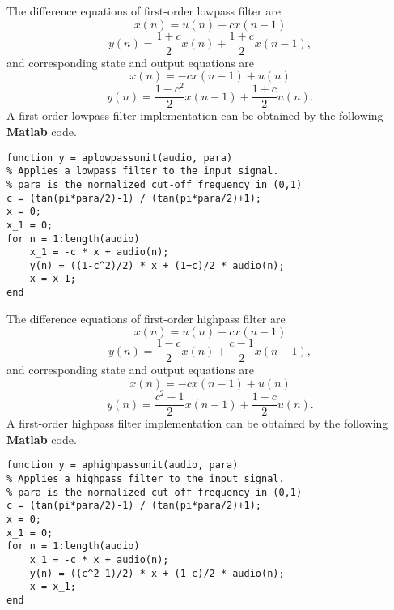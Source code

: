 \documentclass[10pt,a4paper,oneside]{article}
\begin{document}
The difference equations of first-order lowpass filter are
\[
x(n) = u(n) - cx(n-1)
\]
\[
y(n) = \frac{1+c}{2}x(n) + \frac{1+c}{2}x(n-1),
\]
and corresponding state and output equations are
\[
x(n) = -cx(n-1) +u(n)
\]
\[
y(n) = \frac{1-c^2}{2}x(n-1) + \frac{1+c}{2}u(n).
\]
A first-order lowpass filter implementation can be obtained by the following {\bfseries Matlab} code.
\begin{lstlisting}
function y = aplowpassunit(audio, para)
% Applies a lowpass filter to the input signal.
% para is the normalized cut-off frequency in (0,1)
c = (tan(pi*para/2)-1) / (tan(pi*para/2)+1);
x = 0;
x_1 = 0;
for n = 1:length(audio)
	x_1 = -c * x + audio(n);
	y(n) = ((1-c^2)/2) * x + (1+c)/2 * audio(n);
	x = x_1;   
end
\end{lstlisting}

The difference equations of first-order highpass filter are
\[
x(n) = u(n) - cx(n-1)
\]
\[
y(n) = \frac{1-c}{2}x(n) + \frac{c-1}{2}x(n-1),
\]
and corresponding state and output equations are
\[
x(n) = -cx(n-1) + u(n)
\]
\[
y(n) = \frac{c^2-1}{2}x(n-1) + \frac{1-c}{2}u(n).
\]
A first-order highpass filter implementation can be obtained by the following {\bfseries Matlab} code.
\begin{lstlisting}
function y = aphighpassunit(audio, para)
% Applies a highpass filter to the input signal.
% para is the normalized cut-off frequency in (0,1)
c = (tan(pi*para/2)-1) / (tan(pi*para/2)+1);
x = 0;
x_1 = 0;
for n = 1:length(audio)
	x_1 = -c * x + audio(n);
	y(n) = ((c^2-1)/2) * x + (1-c)/2 * audio(n);
	x = x_1;  
end
\end{lstlisting}
\end{document}
